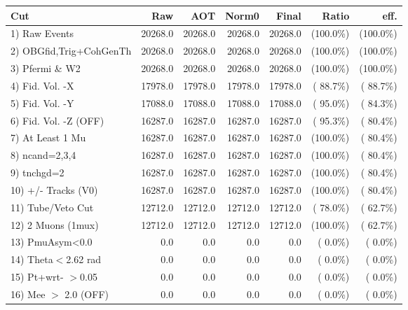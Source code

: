  \begin{table}[h!]\centering
 \begin{tabular}{||l||r|r|r|r|r|r||}
 \hline
 \hline
 Cut & Raw & AOT & Norm0 & Final & Ratio & eff.       \\
 \hline
  1) Raw Events           &      20268.0 &      20268.0 &      20268.0 &      20268.0 & (100.0\%) & (100.0\%) \\
  2) OBGfid,Trig+CohGenTh &      20268.0 &      20268.0 &      20268.0 &      20268.0 & (100.0\%) & (100.0\%) \\
  3) Pfermi \& W2         &      20268.0 &      20268.0 &      20268.0 &      20268.0 & (100.0\%) & (100.0\%) \\
  4) Fid. Vol. -X         &      17978.0 &      17978.0 &      17978.0 &      17978.0 & ( 88.7\%) & ( 88.7\%) \\
  5) Fid. Vol. -Y         &      17088.0 &      17088.0 &      17088.0 &      17088.0 & ( 95.0\%) & ( 84.3\%) \\
  6) Fid. Vol. -Z (OFF)   &      16287.0 &      16287.0 &      16287.0 &      16287.0 & ( 95.3\%) & ( 80.4\%) \\
  7) At Least 1 Mu        &      16287.0 &      16287.0 &      16287.0 &      16287.0 & (100.0\%) & ( 80.4\%) \\
  8) ncand=2,3,4          &      16287.0 &      16287.0 &      16287.0 &      16287.0 & (100.0\%) & ( 80.4\%) \\
  9) tnchgd=2             &      16287.0 &      16287.0 &      16287.0 &      16287.0 & (100.0\%) & ( 80.4\%) \\
 10) +/- Tracks (V0)      &      16287.0 &      16287.0 &      16287.0 &      16287.0 & (100.0\%) & ( 80.4\%) \\
 11) Tube/Veto Cut        &      12712.0 &      12712.0 &      12712.0 &      12712.0 & ( 78.0\%) & ( 62.7\%) \\
 12) 2 Muons (1mux)       &      12712.0 &      12712.0 &      12712.0 &      12712.0 & (100.0\%) & ( 62.7\%) \\
 13) PmuAsym<0.0          &          0.0 &          0.0 &          0.0 &          0.0 & (  0.0\%) & (  0.0\%) \\
 14) Theta$<$2.62 rad     &          0.0 &          0.0 &          0.0 &          0.0 & (  0.0\%) & (  0.0\%) \\
 15) Pt+wrt- $>$0.05      &          0.0 &          0.0 &          0.0 &          0.0 & (  0.0\%) & (  0.0\%) \\
 16) Mee $>$ 2.0  (OFF)   &          0.0 &          0.0 &          0.0 &          0.0 & (  0.0\%) & (  0.0\%) \\

\end{tabular}
\end{table}
